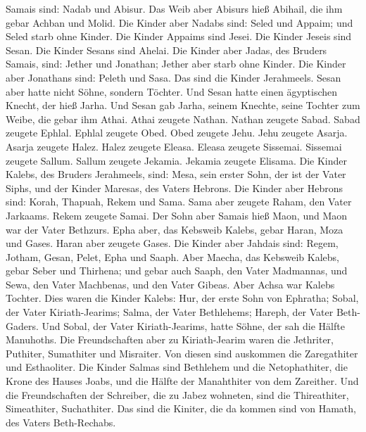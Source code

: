 Samais sind: Nadab und Abisur.  Das Weib aber Abisurs hieß
Abihail, die ihm gebar Achban und Molid.  Die Kinder aber
Nadabs sind: Seled und Appaim; und Seled starb ohne Kinder.
 Die Kinder Appaims sind Jesei. Die Kinder Jeseis sind
Sesan. Die Kinder Sesans sind Ahelai.  Die Kinder aber
Jadas, des Bruders Samais, sind: Jether und Jonathan; Jether aber starb
ohne Kinder.  Die Kinder aber Jonathans sind: Peleth und
Sasa. Das sind die Kinder Jerahmeels.  Sesan aber hatte
nicht Söhne, sondern Töchter. Und Sesan hatte einen ägyptischen Knecht,
der hieß Jarha.  Und Sesan gab Jarha, seinem Knechte, seine
Tochter zum Weibe, die gebar ihm Athai.  Athai zeugete
Nathan. Nathan zeugete Sabad.  Sabad zeugete Ephlal. Ephlal
zeugete Obed.  Obed zeugete Jehu. Jehu zeugete Asarja.
 Asarja zeugete Halez. Halez zeugete Eleasa. 
Eleasa zeugete Sissemai. Sissemai zeugete Sallum.  Sallum
zeugete Jekamia. Jekamia zeugete Elisama.  Die Kinder
Kalebs, des Bruders Jerahmeels, sind: Mesa, sein erster Sohn, der ist
der Vater Siphs, und der Kinder Maresas, des Vaters Hebrons.
 Die Kinder aber Hebrons sind: Korah, Thapuah, Rekem und
Sama.  Sama aber zeugete Raham, den Vater Jarkaams. Rekem
zeugete Samai.  Der Sohn aber Samais hieß Maon, und Maon
war der Vater Bethzurs.  Epha aber, das Kebsweib Kalebs,
gebar Haran, Moza und Gases. Haran aber zeugete Gases.  Die
Kinder aber Jahdais sind: Regem, Jotham, Gesan, Pelet, Epha und Saaph.
 Aber Maecha, das Kebsweib Kalebs, gebar Seber und
Thirhena;  und gebar auch Saaph, den Vater Madmannas, und
Sewa, den Vater Machbenas, und den Vater Gibeas. Aber Achsa war Kalebs
Tochter.  Dies waren die Kinder Kalebs: Hur, der erste Sohn
von Ephratha; Sobal, der Vater Kiriath-Jearims;  Salma, der
Vater Bethlehems; Hareph, der Vater Beth-Gaders.  Und
Sobal, der Vater Kiriath-Jearims, hatte Söhne, der sah die Hälfte
Manuhoths.  Die Freundschaften aber zu Kiriath-Jearim waren
die Jethriter, Puthiter, Sumathiter und Misraiter. Von diesen sind
auskommen die Zaregathiter und Esthaoliter.  Die Kinder
Salmas sind Bethlehem und die Netophathiter, die Krone des Hauses Joabs,
und die Hälfte der Manahthiter von dem Zareither.  Und die
Freundschaften der Schreiber, die zu Jabez wohneten, sind die
Thireathiter, Simeathiter, Suchathiter. Das sind die Kiniter, die da
kommen sind von Hamath, des Vaters Beth-Rechabs.

